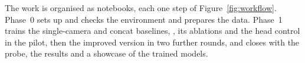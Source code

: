 The work is organised as notebooks, each one step of Figure~\ref{fig:workflow}. Phase~0 sets up and checks the
environment and prepares the data. Phase~1 trains the single-camera and concat baselines, \method{}, its ablations
and the head control in the pilot, then the improved version in two further rounds, and closes with the probe, the
results and a showcase of the trained models.

